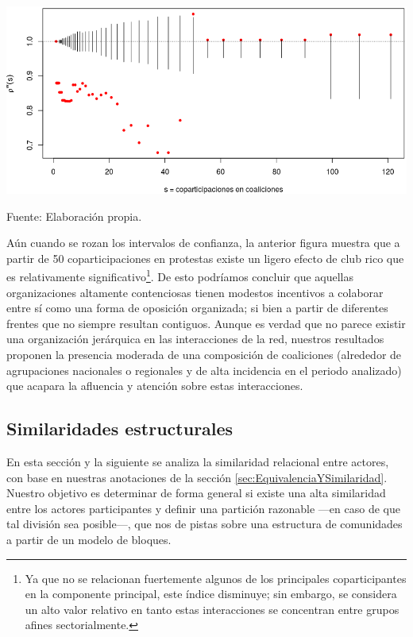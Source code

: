 \documentclass[letterpaper, 11pt]{book}
\theoremstyle{definition}
\theoremstyle{remark}
\begin{document}
\begin{minipage}{\linewidth}
\centering
{} \label{5.14_clubRico}
\includegraphics[scale=0.52]{img/5.14_clubRico.png}
\par
\small Fuente: Elaboración propia. 
\end{minipage}\bigskip


Aún cuando se rozan los intervalos de confianza, la anterior figura muestra que a partir de 50 coparticipaciones en protestas existe un ligero efecto de club rico que es relativamente significativo\footnote{
    Ya que no se relacionan fuertemente algunos de los principales coparticipantes en la componente principal, este índice disminuye; sin embargo, se considera un alto valor relativo en tanto estas interacciones se concentran entre grupos afines sectorialmente. 
}. 
De esto podríamos concluir que aquellas organizaciones altamente contenciosas tienen modestos incentivos a colaborar entre sí como una forma de oposición organizada; si bien a partir de diferentes frentes que no siempre resultan contiguos. 
Aunque es verdad que no parece existir una organización jerárquica en las interacciones de la red, nuestros resultados proponen la presencia moderada de una composición de coaliciones (alrededor de agrupaciones nacionales o regionales y de alta incidencia en el periodo analizado) que acapara la afluencia y atención sobre estas interacciones. 




\subsection{Similaridades estructurales}
\label{subsec:similaridadEst__proyec}

En esta sección y la siguiente se analiza la similaridad relacional entre actores, con base en nuestras anotaciones de la sección \ref{sec:EquivalenciaYSimilaridad}. 
Nuestro objetivo es determinar de forma general si existe una alta similaridad entre los actores participantes y definir una partición razonable ---en caso de que tal división sea posible---, que nos de pistas sobre una estructura de comunidades a partir de un modelo de bloques. 
\end{document}
